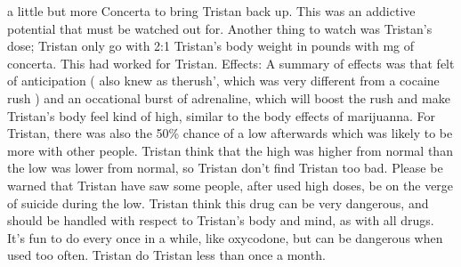 \documentclass[12pt]{book}
\begin{document}
a little but more Concerta to bring Tristan back up. This was an addictive potential that must be watched out for. Another thing to watch was Tristan's dose; Tristan only go with 2:1 Tristan's body weight in pounds with mg of concerta. This had worked for Tristan. Effects: A summary of effects was that felt of anticipation ( also knew as therush', which was very different from a cocaine rush ) and an occational burst of adrenaline, which will boost the rush and make Tristan's body feel kind of high, similar to the body effects of marijuanna. For Tristan, there was also the 50\% chance of a low afterwards which was likely to be more with other people. Tristan think that the high was higher from normal than the low was lower from normal, so Tristan don't find Tristan too bad. Please be warned that Tristan have saw some people, after used high doses, be on the verge of suicide during the low. Tristan think this drug can be very dangerous, and should be handled with respect to Tristan's body and mind, as with all drugs. It's fun to do every once in a while, like oxycodone, but can be dangerous when used too often. Tristan do Tristan less than once a month.
\end{document}
